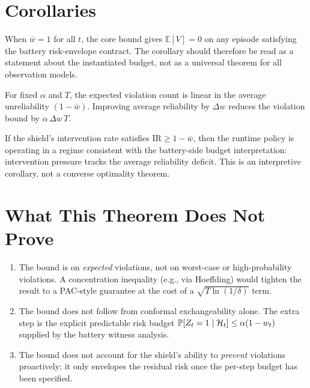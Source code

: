 \section{Corollaries}

\begin{corollary}
\label{cor:perfect-telemetry}
When $\bar{w} = 1$ for all $t$, the core bound gives
$\mathbb{E}[V] = 0$ on any episode satisfying the battery risk-envelope
contract.  The corollary should therefore be read as a statement about the
instantiated budget, not as a universal theorem for all observation models.
\end{corollary}

\begin{corollary}
\label{cor:proportional-safety}
For fixed $\alpha$ and $T$, the expected violation count is
linear in the average unreliability $(1 - \bar{w})$.  Improving
average reliability by $\Delta w$ reduces the violation bound by
$\alpha\,\Delta w\,T$.
\end{corollary}

\begin{corollary}
\label{cor:intervention-sufficiency}
If the shield's intervention rate satisfies
$\text{IR} \ge 1 - \bar{w}$, then the runtime policy is operating in a regime
consistent with the battery-side budget interpretation: intervention pressure
tracks the average reliability deficit.  This is an interpretive corollary,
not a converse optimality theorem.
\end{corollary}

\section{What This Theorem Does Not Prove}

\begin{enumerate}
  \item The bound is on \emph{expected} violations, not on worst-case
    or high-probability violations.  A concentration inequality
    (e.g., via Hoeffding) would tighten the result to a PAC-style
    guarantee at the cost of a $\sqrt{T \ln(1/\delta)}$ term.
  \item The bound does not follow from conformal exchangeability alone.
    The extra step is the explicit predictable risk budget
    $\operatorname{\mathbb{P}}[Z_t=1\mid\mathcal{H}_t] \le \alpha(1-w_t)$ supplied by the battery
    witness analysis.
  \item The bound does not account for the shield's ability to
    \emph{prevent} violations proactively; it only envelopes the residual
    risk once the per-step budget has been specified.
\end{enumerate}

